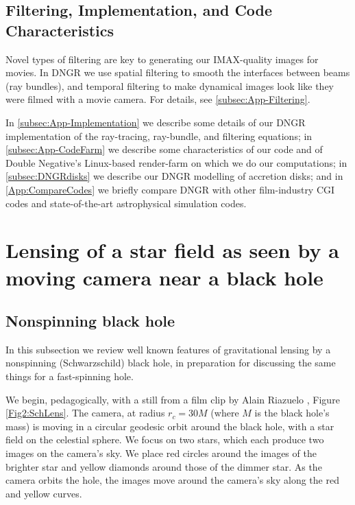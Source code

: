 \documentclass[12pt]{iopart}
\begin{document}
\subsection{Filtering, Implementation, and Code Characteristics}
\label{subsec:DNGRDetails}

Novel types of filtering are key to generating our IMAX-quality images for movies.  In DNGR we use
spatial filtering to smooth the interfaces between beams (ray bundles), and temporal filtering to make dynamical images look like they were filmed with a movie camera.   For 
details, see   \ref{subsec:App-Filtering}.

In \ref{subsec:App-Implementation} we describe some details of our DNGR implementation of the ray-tracing, ray-bundle, and filtering equations; in 
\ref{subsec:App-CodeFarm} we describe some characteristics of our code and of 
Double Negative's Linux-based render-farm on which we do our computations; 
in \ref{subsec:DNGRdisks} we describe our DNGR modelling of accretion disks; and in 
\ref{App:CompareCodes} we briefly compare DNGR with other film-industry CGI codes and  state-of-the-art astrophysical simulation codes. 

\section{Lensing of a star field as seen by a moving camera near a black hole}
\label{sec:StarField}

\subsection{Nonspinning black hole}
\label{subsec:SchStarField}

In this subsection we review well known features of gravitational lensing by a nonspinning
(Schwarzschild) black hole, in preparation for discussing the same things for a
fast-spinning hole.

We begin, pedagogically, with a still from a film clip by Alain Riazuelo \cite{Riazuelo14}, 
Figure \ref{Fig2:SchLens}.  The camera, at radius $r_c=30M$ (where $M$ is the 
black hole's mass) is moving in a circular geodesic orbit around the black hole, with a star field on the celestial sphere.  We focus on two stars,
which each produce two images on the camera's sky.  We place red circles around 
the images of the brighter star and yellow diamonds around those of the dimmer star.
As the camera orbits the hole, the images move around the camera's sky along the 
red and yellow curves.
\end{document}
